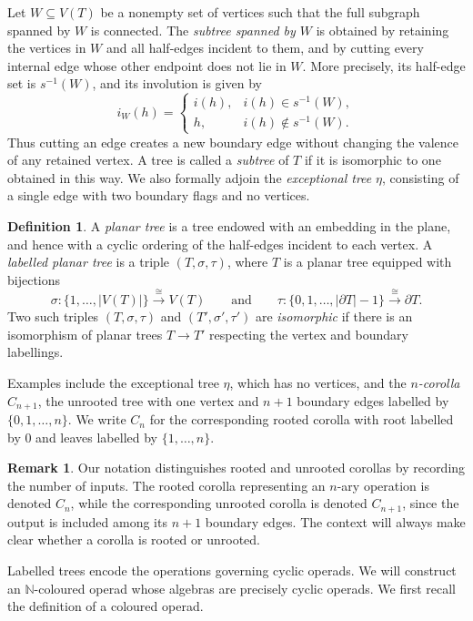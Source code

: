 \documentclass{amsart}
\theoremstyle{definition}
\newtheorem{definition}[theorem]{Definition}%
\newtheorem{remark}[theorem]{Remark}%
\numberwithin{equation}{section}
\begin{document}
Let $W\subseteq V(T)$ be a nonempty set of vertices such that the
full subgraph spanned by $W$ is connected. The \emph{subtree spanned
by $W$} is obtained by retaining the vertices in $W$ and all
half-edges incident to them, and by cutting every internal edge whose
other endpoint does not lie in $W$. More precisely, its half-edge set
is $s^{-1}(W)$, and its involution is given by
\[
i_W(h)=
\begin{cases}
i(h), & i(h)\in s^{-1}(W),\\
h,    & i(h)\notin s^{-1}(W).
\end{cases}
\]
Thus cutting an edge creates a new boundary edge without changing the
valence of any retained vertex. A tree is called a \emph{subtree} of
$T$ if it is isomorphic to one obtained in this way. We also formally
adjoin the \emph{exceptional tree} $\eta$, consisting of a single edge
with two boundary flags and no vertices.

\begin{definition}
A \emph{planar tree} is a tree endowed with an embedding in the plane,
and hence with a cyclic ordering of the half-edges incident to each
vertex. A \emph{labelled planar tree} is a triple $(T,\sigma,\tau)$,
where $T$ is a planar tree equipped with bijections
\[
\sigma\colon\{1,\dots,|V(T)|\}\xrightarrow{\cong}V(T)
\qquad\text{and}\qquad
\tau\colon\{0,1,\dots,|\partial T|-1\}
\xrightarrow{\cong}\partial T.
\]
Two such triples $(T,\sigma,\tau)$ and $(T',\sigma',\tau')$ are
\emph{isomorphic} if there is an isomorphism of planar trees
$T\to T'$ respecting the vertex and boundary labellings.
\end{definition}
Examples include the exceptional tree $\eta$, which has no vertices,
and the \emph{$n$-corolla} $C_{n+1}$, the unrooted
tree with one vertex and $n+1$ boundary edges labelled by
$\{0,1,\ldots,n\}$. We write $C_n$ for the corresponding rooted
corolla with root labelled by $0$ and leaves labelled by
$\{1,\ldots,n\}$.

\begin{remark}
Our notation distinguishes rooted and unrooted corollas by recording
the number of inputs. The rooted corolla representing an $n$-ary
operation is denoted $C_n$, while the corresponding unrooted corolla
is denoted $C_{n+1}$, since the output is included among its $n+1$
boundary edges. The context will always make clear whether a corolla
is rooted or unrooted.
\end{remark}

Labelled trees encode the operations governing cyclic operads. We
will construct an $\mathbb N$-coloured operad whose algebras are
precisely cyclic operads. We first recall the definition of a
coloured operad.
\end{document}
